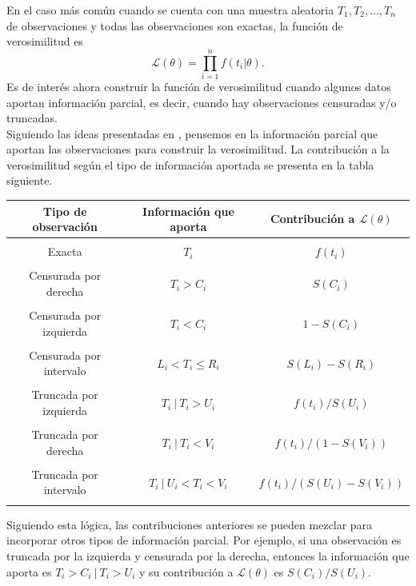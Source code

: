 \documentclass[11pt,a4paper]{article}
\begin{document}
En el caso más común cuando se cuenta con una muestra aleatoria $T_1, T_2, \dots, T_n$ de observaciones y todas las observaciones son exactas, la función de verosimilitud es $$\mathcal{L}(\theta) = \prod_{i = 1}^n f(t_i|\theta).$$ Es de interés ahora construir la función de verosimilitud cuando algunos datos aportan información parcial, es decir, cuando hay observaciones censuradas y/o truncadas.\\

Siguiendo las ideas presentadas en \cite{klein}, pensemos en la información parcial que aportan las observaciones para construir la verosimilitud. La contribución a la verosimilitud según el tipo de información aportada se presenta en la tabla siguiente.\\

\begin{center}
\begin{tabular}{ |c|c|c| } 
 \hline
 Tipo de observación & Información que aporta & Contribución a $\mathcal{L}(\theta)$\\
 \hline
 & & \\
 Exacta & $T_i$ & $f(t_i)$\\
  & & \\
 Censurada por derecha & $T_i > C_i$ & $S(C_i)$\\
  & & \\
 Censurada por izquierda & $T_i < C_i$ & $1-S(C_i)$\\
  & & \\
 Censurada por intervalo & $L_i < T_i \leq R_i$ & $S(L_i)-S(R_i)$\\
  & & \\
 Truncada por izquierda & $T_i \ | \ T_i > U_i$ & $f(t_i)/S(U_i)$ \\
  & & \\
 Truncada por derecha & $T_i \ | \ T_i < V_i$ & $f(t_i)/(1-S(V_i))$ \\
  & & \\
 Truncada por intervalo & $T_i \ | \ U_i < T_i < V_i$ & $f(t_i)/(S(U_i)-S(V_i))$ \\
  & & \\
 \hline
\end{tabular}
\end{center}

Siguiendo esta lógica, las contribuciones anteriores se pueden mezclar para incorporar otros tipos de información parcial. Por ejemplo, si una observación es truncada por la izquierda y censurada por la derecha, entonces la información que aporta es $T_i>C_i \ | \ T_i > U_i$ y su contribución a $\mathcal{L}(\theta)$ es $S(C_i)/S(U_i)$.\\
\end{document}
